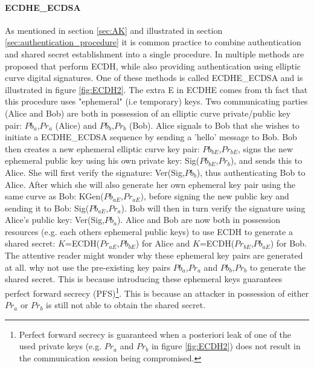 \documentclass[master=cws,masteroption=vs,english]{kulemt}
\begin{document}
\paragraph{ECDHE\_ECDSA} As mentioned in section \ref{sec:AK} and illustrated in section \ref{sec:authentication_procedure} it is common practice to combine authentication and shared secret establishment into a single procedure. In \cite{RFC4492} multiple methods are proposed that perform ECDH, while also providing authentication using elliptic curve digital signatures. One of these methods is called ECDHE\_ECDSA and is illustrated in figure \ref{fig:ECDH2}. The extra E in ECDHE comes from th fact that this procedure uses "ephemeral" (i.e temporary) keys. Two communicating parties (Alice and Bob) are both in possession of an elliptic curve private/public key pair: $Pb_a$,$Pr_a$ (Alice) and $Pb_b$,$Pr_b$ (Bob). Alice signals to Bob that she wishes to initiate a ECDHE\_ECDSA sequence by sending a 'hello' message to Bob. Bob then creates a new ephemeral elliptic curve key pair: $Pb_{bE}$,$Pr_{bE}$, signs the new ephemeral public key using his own private key: Sig($Pb_{bE}$,$Pr_b$), and sends this to Alice. She will first verify the signature: Ver(Sig,$Pb_{b}$), thus authenticating Bob to Alice. After which she will also generate her own ephemeral key pair using the same curve as Bob: KGen($Pb_{aE}$,$Pr_{aE}$), before signing the new public key and sending it to Bob: Sig($Pb_{aE}$,$Pr_a$). Bob will then in turn verify the signature using Alice's public key: Ver(Sig,$Pb_{a}$). Alice and Bob are now both in possession resources (e.g. each others ephemeral public keys) to use ECDH to generate a shared secret: $K$=ECDH($Pr_{aE}$,$Pb_{bE}$) for Alice and $K$=ECDH($Pr_{bE}$,$Pb_{aE}$) for Bob. The attentive reader might wonder why these ephemeral key pairs are generated at all. why not use the pre-existing key pairs $Pb_a$,$Pr_a$ and $Pb_b$,$Pr_b$ to generate the shared secret. This is because introducing these ephemeral keys guarantees perfect forward secrecy (PFS)\footnote{Perfect forward secrecy is guaranteed when a posteriori leak of one of the used private keys (e.g. $Pr_a$ and $Pr_b$ in figure \ref{fig:ECDH2}) does not result in the communication session being compromised.}. This is because an attacker in possession of either $Pr_a$ or $Pr_b$ is still not able to obtain the shared secret.
\end{document}
